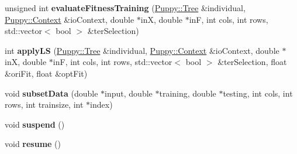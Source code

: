\begin{DoxyCompactItemize}
\item 
\hypertarget{classWorker_a26bc4ee37a10f29906f027d611985548}{}unsigned int {\bfseries evaluate\+Fitness\+Training} (\hyperlink{classPuppy_1_1Tree}{Puppy\+::\+Tree} \&individual, \hyperlink{classPuppy_1_1Context}{Puppy\+::\+Context} \&io\+Context, double $\ast$in\+X, double $\ast$in\+F, int cols, int rows, std\+::vector$<$ bool $>$ \&ter\+Selection)\label{classWorker_a26bc4ee37a10f29906f027d611985548}

\item 
\hypertarget{classWorker_a059d485ed0ff18bfcc245e03ae1f5af8}{}int {\bfseries apply\+L\+S} (\hyperlink{classPuppy_1_1Tree}{Puppy\+::\+Tree} \&individual, \hyperlink{classPuppy_1_1Context}{Puppy\+::\+Context} \&io\+Context, double $\ast$in\+X, double $\ast$in\+F, int cols, int rows, std\+::vector$<$ bool $>$ \&ter\+Selection, float \&ori\+Fit, float \&opt\+Fit)\label{classWorker_a059d485ed0ff18bfcc245e03ae1f5af8}

\item 
\hypertarget{classWorker_a6c8b8185bb9312134a86c1955f117890}{}void {\bfseries subset\+Data} (double $\ast$input, double $\ast$training, double $\ast$testing, int cols, int rows, int trainsize, int $\ast$index)\label{classWorker_a6c8b8185bb9312134a86c1955f117890}

\item 
\hypertarget{classWorker_a28d4ce0b0b8b86d4ab84d16c80770121}{}void {\bfseries suspend} ()\label{classWorker_a28d4ce0b0b8b86d4ab84d16c80770121}

\item 
\hypertarget{classWorker_a4e9811249da41dbc61677682b9e9a4ab}{}void {\bfseries resume} ()\label{classWorker_a4e9811249da41dbc61677682b9e9a4ab}

\end{DoxyCompactItemize}
